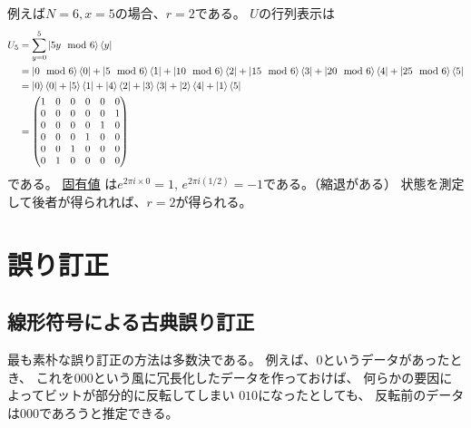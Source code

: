 \documentclass[]{ltjsarticle}
\begin{document}
例えば$N=6, x=5$の場合、$r=2$である。
$U$の行列表示は
\begin{align}
    U_5 
    &= 
    \sum_{y=0}^{5} \ket{5y \mod 6}\bra{y} \\
    &=
    \ket{0 \mod 6}\bra{0}
    +
    \ket{5 \mod 6}\bra{1}
    +
    \ket{10 \mod 6}\bra{2}
    +
    \ket{15 \mod 6}\bra{3}
    +
    \ket{20 \mod 6}\bra{4}
    +
    \ket{25 \mod 6}\bra{5} \\
    &=
    \ket{0}\bra{0}
    +
    \ket{5}\bra{1}
    +
    \ket{4}\bra{2}
    +
    \ket{3}\bra{3}
    +
    \ket{2}\bra{4}
    +
    \ket{1}\bra{5} \\ 
    &=
    \begin{pmatrix}
        1 & 0 & 0 & 0 & 0 & 0 \\
        0 & 0 & 0 & 0 & 0 & 1 \\
        0 & 0 & 0 & 0 & 1 & 0 \\
        0 & 0 & 0 & 1 & 0 & 0 \\
        0 & 0 & 1 & 0 & 0 & 0 \\
        0 & 1 & 0 & 0 & 0 & 0
    \end{pmatrix}
\end{align}
である。
\href{https://ja.wolframalpha.com/input?i=%7B%7B1%2C+0%2C+0%2C+0%2C+0%2C+0%7D%2C+%7B0%2C+0%2C+0%2C+0%2C+0%2C+1%7D%2C+%7B0%2C+0%2C+0%2C+0%2C+1%2C+0%7D%2C+%7B0%2C+0%2C+0%2C+1%2C+0%2C+0%7D%2C+%7B0%2C+0%2C+1%2C+0%2C+0%2C+0%7D%2C+%7B0%2C+1%2C+0%2C+0%2C+0%2C+0%7D%7D}{固有値}
は$e^{2\pi i \times 0} =1$, $e^{2\pi i (1/2)} = -1$である。（縮退がある）
状態を測定して後者が得られれば、$r=2$が得られる。




\section{誤り訂正}
\subsection{線形符号による古典誤り訂正}
最も素朴な誤り訂正の方法は多数決である。
例えば、$0$というデータがあったとき、
これを$000$という風に冗長化したデータを作っておけば、
何らかの要因によってビットが部分的に反転してしまい
$010$になったとしても、
反転前のデータは$000$であろうと推定できる。
\end{document}
